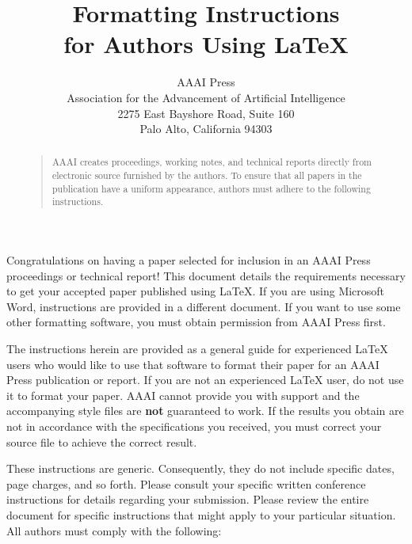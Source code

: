 \documentclass[letterpaper]{article}
\begin{document}
	\title{Formatting Instructions \\for Authors Using \LaTeX{}}
	\author{AAAI Press\\
		Association for the Advancement of Artificial Intelligence\\
		2275 East Bayshore Road, Suite 160\\
		Palo Alto, California 94303\\
	}
	\maketitle
	\begin{abstract}
		\begin{quote}
			AAAI creates proceedings, working notes, and technical reports directly from electronic source furnished by the authors. To ensure that all papers in the publication have a uniform appearance, authors must adhere to the following instructions. 
		\end{quote}
	\end{abstract}
	
	\noindent Congratulations on having a paper selected for inclusion in an AAAI Press proceedings or technical report! This document details the requirements necessary to get your accepted paper published using \LaTeX{}. If you are using Microsoft Word, instructions are provided in a different document. If you want to use some other formatting software, you must obtain permission from AAAI Press first. 
	
	The instructions herein are provided as a general guide for experienced \LaTeX{} users who would like to use that software to format their paper for an AAAI Press publication or report. If you are not an experienced \LaTeX{} user, do not use it to format your paper. AAAI cannot provide you with support and the accompanying style files are \textbf{not} guaranteed to work. If the results you obtain are not in accordance with the specifications you received, you must correct your source file to achieve the correct result. 
	
	These instructions are generic. Consequently, they do not include specific dates, page charges, and so forth. Please consult your specific written conference instructions for details regarding your submission. Please review the entire document for specific instructions that might apply to your particular situation. All authors must comply with the following:
	
\end{document}
